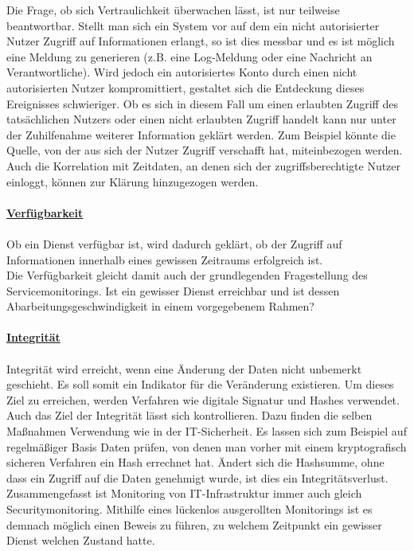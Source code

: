 Die Frage, ob sich Vertraulichkeit überwachen lässt, ist nur teilweise beantwortbar.
Stellt man sich ein System vor auf dem ein nicht autorisierter Nutzer Zugriff auf
Informationen erlangt, so ist dies messbar und es ist möglich eine Meldung 
zu generieren (z.B. eine Log-Meldung oder eine Nachricht an Verantwortliche). Wird 
jedoch ein autorisiertes Konto durch einen nicht autorisierten Nutzer kompromittiert,
gestaltet sich die Entdeckung dieses Ereignisses schwieriger. Ob es sich in diesem Fall 
um einen erlaubten Zugriff des tatsächlichen Nutzers oder einen nicht erlaubten Zugriff
handelt kann nur unter der Zuhilfenahme weiterer Information geklärt werden.
Zum Beispiel könnte die Quelle, von der aus sich der Nutzer 
Zugriff verschafft hat, miteinbezogen werden. Auch die Korrelation mit Zeitdaten, an 
denen sich der zugriffsberechtigte Nutzer einloggt, können zur Klärung hinzugezogen 
werden.\\\\

\underline{\textbf{Verfügbarkeit}}\\\\
Ob ein Dienst verfügbar ist, wird dadurch geklärt, ob der Zugriff auf Informationen
innerhalb eines gewissen Zeitraums erfolgreich ist.\\

Die Verfügbarkeit gleicht damit auch der grundlegenden Fragestellung des 
Servicemonitorings. Ist ein gewisser Dienst erreichbar und ist dessen 
Abarbeitungsgeschwindigkeit in einem vorgegebenem Rahmen?\\\\
\newpage
\underline{\textbf{Integrität}}\\\\
Integrität wird erreicht, wenn eine Änderung der Daten nicht unbemerkt geschieht. Es soll 
somit ein Indikator für die Veränderung existieren. Um dieses Ziel zu erreichen, werden
Verfahren wie digitale Signatur und Hashes verwendet.\\

Auch das Ziel der Integrität lässt sich kontrollieren. Dazu finden die selben Maßnahmen 
Verwendung wie in der IT-Sicherheit. Es lassen sich zum Beispiel auf regelmäßiger Basis 
Daten prüfen, von denen man vorher mit einem kryptografisch sicheren Verfahren ein Hash 
errechnet hat. Ändert sich die Hashsumme, ohne dass ein Zugriff auf die Daten genehmigt 
wurde, ist dies ein Integritätsverlust.\\

Zusammengefasst ist Monitoring von IT-Infrastruktur immer auch gleich Securitymonitoring. 
Mithilfe eines lückenlos ausgerollten Monitorings ist es demnach möglich einen Beweis zu 
führen, zu welchem Zeitpunkt ein gewisser Dienst welchen Zustand hatte.
 
